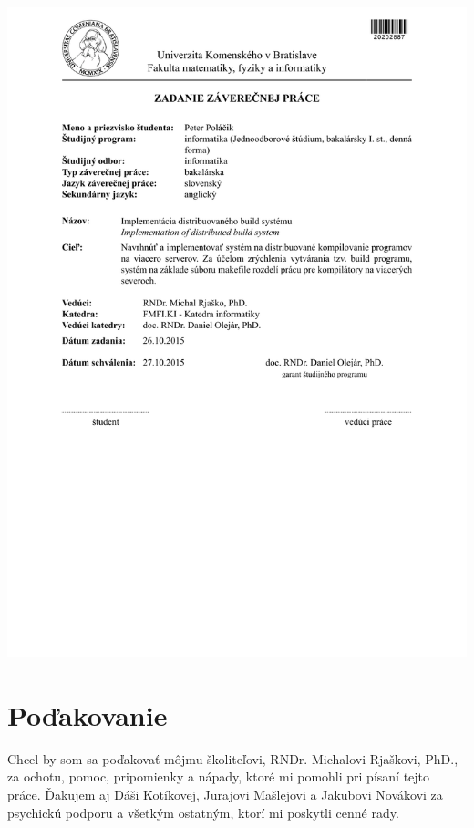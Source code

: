 \documentclass[12pt, oneside]{book}
\begin{document}
\newpage
\thispagestyle{empty}
\hspace{-4cm}\includegraphics[width=1.35\textwidth]{images/assignment}


\frontmatter

\setcounter{page}{3}

\newpage
\section*{Poďakovanie}

Chcel by som sa poďakovať môjmu školiteľovi, RNDr. Michalovi Rjaškovi, PhD., za ochotu,
pomoc, pripomienky a nápady, ktoré mi pomohli pri písaní tejto práce. Ďakujem aj
Dáši Kotíkovej, Jurajovi Mašlejovi a Jakubovi Novákovi za psychickú podporu a všetkým
ostatným, ktorí mi poskytli cenné rady.
\end{document}
